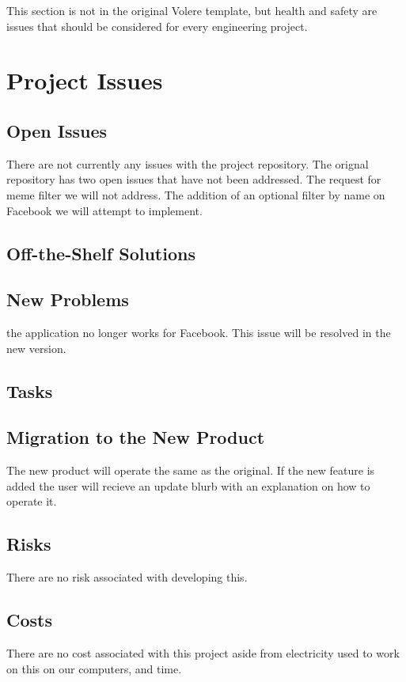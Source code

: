 \documentclass[12pt, titlepage]{article}
\begin{document}
This section is not in the original Volere template, but health and safety are
issues that should be considered for every engineering project.

\section{Project Issues}

\subsection{Open Issues}
There are not currently any issues with the project repository. The orignal repository has two open issues that have not been addressed. The request for meme filter we will not address. The addition of an optional filter by name on Facebook we will attempt to implement. 

\subsection{Off-the-Shelf Solutions}

\subsection{New Problems}
the application no longer works for Facebook. This issue will be resolved in the new version.

\subsection{Tasks}

\subsection{Migration to the New Product}
The new product will operate the same as the original. If the new feature is added the user will recieve an update blurb with an explanation on how to operate it. 

\subsection{Risks}
There are no risk associated with developing this.

\subsection{Costs}
There are no cost associated with this project aside from electricity used to work on this on our computers, and time. 
\end{document}
